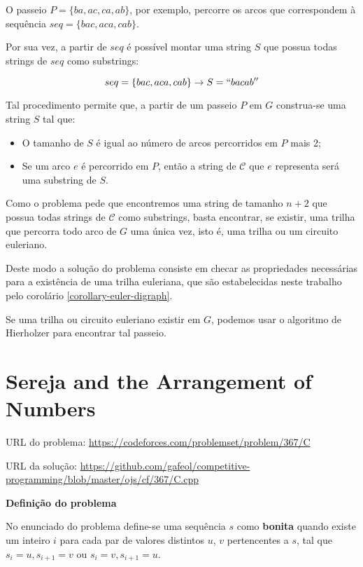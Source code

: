         O passeio $P = \{ba, ac, ca, ab\}$, por exemplo, percorre os arcos que correspondem à sequência $seq = \{bac, aca, cab\}$.

        Por sua vez, a partir de $seq$ é possível montar uma string $S$ que possua todas strings de $seq$ como substrings:

        \[seq = \{bac, aca, cab\} \rightarrow S = ``bacab'' \]

        Tal procedimento permite que, a partir de um passeio $P$ em $G$ construa-se uma string $S$ tal que:
        
        \begin{itemize}
            \item O tamanho de $S$ é igual ao número de arcos percorridos em $P$ mais 2;
            \item Se um arco $e$ é percorrido em $P$, então a string de $\mathcal{C}$ que $e$ representa será uma substring de $S$.
        \end{itemize}

        Como o problema pede que encontremos uma string de tamanho $n+2$ que possua todas strings de $\mathcal{C}$ como substrings, basta encontrar, se existir, uma trilha que percorra todo arco de $G$ uma única vez, isto é, uma trilha ou um circuito euleriano.

        Deste modo a solução do problema consiste em checar as propriedades necessárias para a existência de uma trilha euleriana, que são estabelecidas neste trabalho pelo corolário \ref{corollary-euler-digraph}.

        Se uma trilha ou circuito euleriano existir em $G$, podemos usar o algoritmo de Hierholzer para encontrar tal passeio.

        \section{Sereja and the Arrangement of Numbers}

        \hspace{0.55cm} URL do problema: \href{https://codeforces.com/problemset/problem/367/C}{https://codeforces.com/problemset/problem/367/C}

        URL da solução: \href{https://github.com/gafeol/competitive-programming/blob/master/ojs/cf/367/C.cpp}{https://github.com/gafeol/competitive-program\-ming\-/blob/master/ojs/cf/367/C.cpp}

        \textbf{Definição do problema}

        No enunciado do problema define-se uma sequência $s$ como \textbf{bonita} quando existe um inteiro $i$ para cada par de valores distintos $u$, $v$ pertencentes a $s$, tal que $s_i = u, s_{i+1} = v$ ou $s_i = v, s_{i+1} = u$.

